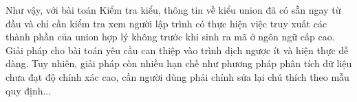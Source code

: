 Như vậy, với bài toán Kiểm tra kiểu, thông tin về kiểu union đã có sẵn ngay từ đầu và chỉ cần kiểm tra xem người lập trình có thực hiện việc truy xuất các thành phần của union hợp lý không trước khi sinh ra mã ở ngôn ngữ cấp cao. Giải pháp cho bài toán yêu cầu can thiệp vào trình dịch ngược ít và hiện thực dễ dàng. Tuy nhiên, giải pháp còn nhiều hạn chế như phương pháp phân tích dữ liệu chưa đạt độ chính xác cao, cần người dùng phải chỉnh sửa lại chú thích theo mẫu quy định...



